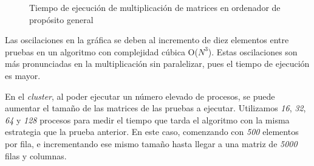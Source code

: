 		\begin{figure}[!h]
		\centering
		\caption{Tiempo de ejecución de multiplicación de matrices en ordenador de propósito general}
		\label{fig:mult_matrices}
		\end{figure}
		
		
		
		\newpage
		
		Las oscilaciones en la gráfica se deben al incremento de diez elementos entre pruebas en un algoritmo con complejidad cúbica O($N^{3}$). Estas oscilaciones son más pronunciadas en la multiplicación sin paralelizar, pues el tiempo de ejecución es mayor.
		
		En el \textit{cluster}, al poder ejecutar un número elevado de procesos, se puede aumentar el tamaño de las matrices de las pruebas a ejecutar. Utilizamos \textit{16}, \textit{32}, \textit{64} y \textit{128} procesos para medir el tiempo que tarda el algoritmo con la misma estrategia que la prueba anterior. En este caso, comenzando con \textit{500} elementos por fila, e incrementando ese mismo tamaño hasta llegar a una matriz de \textit{5000} filas y columnas. 
				

